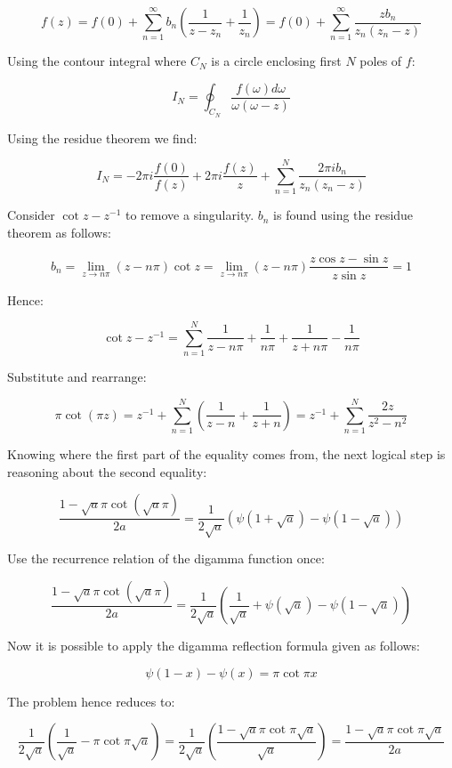 $$
f(z) = f(0) + \sum_{n=1}^\infty b_n \left(\frac{1}{z-z_n} + \frac{1}{z_n}\right) = f(0) + \sum_{n=1}^\infty \frac{zb_n}{z_n(z_n-z)}
$$

\noindent Using the contour integral where $C_N$ is a circle enclosing first $N$ poles of $f$:

$$
I_N = \oint_{C_N} \frac{f(\omega)d\omega}{\omega(\omega - z)}
$$

\noindent Using the residue theorem we find:

$$
I_N = -2\pi i \frac{f(0)}{f(z)} + 2\pi i \frac{f(z)}{z} + \sum_{n=1}^N \frac{2\pi i b_n}{z_n(z_n - z)}
$$

\noindent Consider $\cot z - z^{-1}$ to remove a singularity. $b_n$ is found using the residue theorem as follows:

$$
b_n = \lim_{z \to n\pi} (z-n\pi)\cot z = \lim_{z \to n\pi} (z-n\pi) \frac{z \cos z - \sin z}{z \sin z} = 1
$$

\noindent Hence:

$$
\cot z - z^{-1} = \sum_{n=1}^N \frac{1}{z-n\pi} + \frac{1}{n\pi} + \frac{1}{z+n\pi} - \frac{1}{n\pi}
$$

\noindent Substitute and rearrange:

$$
\pi \cot(\pi z) = z^{-1} + \sum_{n=1}^N \left(\frac{1}{z-n} + \frac{1}{z+n}\right) = z^{-1} + \sum_{n=1}^N \frac{2z}{z^2-n^2}
$$

\noindent Knowing where the first part of the equality comes from, the next logical step is reasoning about the second equality:

$$
\frac{1-\sqrt{a}\pi\cot(\sqrt{a}\pi)}{2a} = \frac{1}{2\sqrt{a}}\left(\psi\left(1+\sqrt{a}\right)-\psi\left(1-\sqrt{a}\right)\right)
$$

\noindent Use the recurrence relation of the digamma function once:

$$
\frac{1-\sqrt{a}\pi\cot(\sqrt{a}\pi)}{2a} = \frac{1}{2\sqrt{a}}\left(\frac{1}{\sqrt{a}}+\psi\left(\sqrt{a}\right)-\psi\left(1-\sqrt{a}\right)\right)
$$

\noindent Now it is possible to apply the digamma reflection formula given as follows:

$$
\psi (1-x)-\psi (x)=\pi \cot \pi x
$$

\noindent The problem hence reduces to:

$$
\frac{1}{2\sqrt{a}}\left(\frac{1}{\sqrt{a}}-\pi\cot\pi\sqrt{a}\right) = \frac{1}{2\sqrt{a}}\left(\frac{1-\sqrt{a}\pi\cot\pi\sqrt{a}}{\sqrt{a}}\right) = \frac{1-\sqrt{a}\pi\cot\pi\sqrt{a}}{2a}
$$

